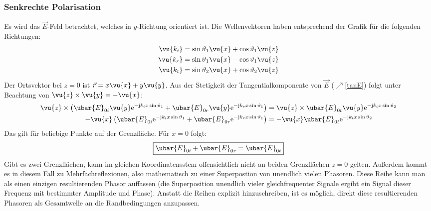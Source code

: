 	  \subsubsection{Senkrechte Polarisation}
	Es wird das \(\vec{E}\)-Feld betrachtet, welches in $y$-Richtung orientiert ist. Die Wellenvektoren haben entsprechend der Grafik für  die folgenden Richtungen:
			        \begin{align}
				        \vu{{k_i}} & = \sin\vartheta_1\vu{x} + \cos\vartheta_1\vu{z} \nonumber \\
				        \vu{{k_r}} & = \sin\vartheta_1\vu{x} - \cos\vartheta_1\vu{z} \label{ekrgln} \\
				        \vu{{k_t}} & = \sin\vartheta_2\vu{x} + \cos\vartheta_2\vu{z} \nonumber
			        \end{align}
		Der Ortsvektor bei \(z=0
			        \) ist \(\vec{r}  = x\vu{x} + y \vu{y}\).
			   Aus der Stetigkeit der Tangentialkomponente von \(\vec{E}\) ($\nearrow$\ref{tanE}) folgt unter Beachtung von $\vu{z} \times \vu{y} = -\vu{x}$:
			        \begin{equation}\begin{split}
					        \vu{z} \times \left(\ubar{E}_{0i} \vu{y} \mathrm{e}^{-\mathrm{j} k_i x \sin\vartheta_1} + \ubar{E}_{0r} \vu{y} \mathrm{e}^{-\mathrm{j} k_r x \sin\vartheta_1}   \right) &= \vu{z} \times \ubar{E}_{0t} \vu{y} \mathrm{e}^{-\mathrm{j} k_t x \sin\vartheta_2}   \\
					        -\vu{x}  \left(\ubar{E}_{0i}  \mathrm{e}^{-\mathrm{j} k_i x \sin\vartheta_1} + \ubar{E}_{0r} \mathrm{e}^{-\mathrm{j} k_r x \sin\vartheta_1}   \right) &= -\vu{x}  \ubar{E}_{0t}  \mathrm{e}^{-\mathrm{j} k_t x \sin\vartheta_2}
				        \end{split}\end{equation}
			   Das gilt für beliebige Punkte auf der Grenzfläche. Für \(x=0\) folgt:
			        \begin{equation}\label{refltransbzh1}
				        \boxed{ \ubar{E}_{0i} + \ubar{E}_{0r}= \ubar{E}_{0t}}
			        \end{equation}
			       Gibt es zwei Grenzflächen, kann im gleichen Koordinatensstem offensichtlich nicht an beiden Grenzflächen $z=0$ gelten. Außerdem kommt es in diesem Fall zu Mehrfachreflexionen, also mathematisch zu einer Superpostion von unendlich vielen Phasoren. Diese Reihe kann man als einen einzigen resultierenden Phasor auffassen (die Superposition unendlich vieler gleichfrequenter Signale ergibt ein Signal dieser Frequenz mit bestimmter Amplitude und Phase). Anstatt die Reihen explizit hinzuschreiben, ist es möglich, direkt diese resultierenden Phasoren als Gesamtwelle an die Randbedingungen anzupassen.\\
